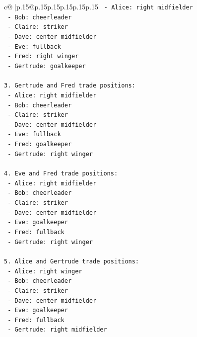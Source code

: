 \documentclass{article}
\begin{document}
{\begin{supertabular}{c@{$\;$}|p{.15\linewidth}@{}p{.15\linewidth}p{.15\linewidth}p{.15\linewidth}p{.15\linewidth}p{.15\linewidth}}
{{{\texttt{   {-} Alice: right midfielder} \\
\texttt{   {-} Bob: cheerleader} \\
\texttt{   {-} Claire: striker} \\
\texttt{   {-} Dave: center midfielder} \\
\texttt{   {-} Eve: fullback} \\
\texttt{   {-} Fred: right winger} \\
\texttt{   {-} Gertrude: goalkeeper} \\
\\ 
\texttt{3. Gertrude and Fred trade positions:} \\
\texttt{   {-} Alice: right midfielder} \\
\texttt{   {-} Bob: cheerleader} \\
\texttt{   {-} Claire: striker} \\
\texttt{   {-} Dave: center midfielder} \\
\texttt{   {-} Eve: fullback} \\
\texttt{   {-} Fred: goalkeeper} \\
\texttt{   {-} Gertrude: right winger} \\
\\ 
\texttt{4. Eve and Fred trade positions:} \\
\texttt{   {-} Alice: right midfielder} \\
\texttt{   {-} Bob: cheerleader} \\
\texttt{   {-} Claire: striker} \\
\texttt{   {-} Dave: center midfielder} \\
\texttt{   {-} Eve: goalkeeper} \\
\texttt{   {-} Fred: fullback} \\
\texttt{   {-} Gertrude: right winger} \\
\\ 
\texttt{5. Alice and Gertrude trade positions:} \\
\texttt{   {-} Alice: right winger} \\
\texttt{   {-} Bob: cheerleader} \\
\texttt{   {-} Claire: striker} \\
\texttt{   {-} Dave: center midfielder} \\
\texttt{   {-} Eve: goalkeeper} \\
\texttt{   {-} Fred: fullback} \\
\texttt{   {-} Gertrude: right midfielder} \\
\\ 
}}}
\end{supertabular}}
\end{document}
